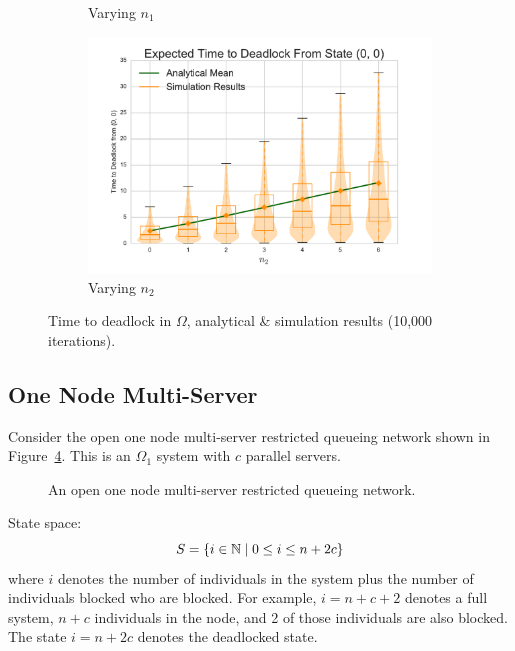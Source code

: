 \documentclass{article}
\numberwithin{equation}{section}
\begin{document}
\begin{figure}[!htbp]
\begin{center}
\begin{subfigure}[b]{0.35\textwidth}
  \caption{Varying $n_1$}
  \label{fig:timestodeadlockfb_n1}
\end{subfigure}
\begin{subfigure}[b]{0.35\textwidth}
  \includegraphics[width=\textwidth]{images/vary_n2fb}
  \caption{Varying $n_2$}
  \label{fig:timestodeadlockfb_n2}
\end{subfigure}
\end{center}
\caption{Time to deadlock in $\Omega$, analytical \& simulation results (10,000 iterations).}
\label{fig:timestodeadlockfeedback}
\end{figure}


\subsection{One Node Multi-Server}\label{sec:1nodeMS}

Consider the open one node multi-server restricted queueing network shown in Figure~\ref{fig:queueingnetwork_1nodemulti}.
This is an $\Omega_1$ system with $c$ parallel servers.

\begin{figure}[!htbp]
  \begin{center}
  
  \end{center}
  \caption{An open one node multi-server restricted queueing network.}
  \label{fig:queueingnetwork_1nodemulti}
\end{figure}

State space:
        \[S = \{i\in\mathbb{N} \nonscript\; | \nonscript\; 0 \leq i \leq n + 2c\}\]
where \(i\) denotes the number of individuals in the system plus the number of individuals blocked who are blocked.
For example, $i=n+c+2$ denotes a full system, $n+c$ individuals in the node, and 2 of those individuals are also blocked.
The state $i=n+2c$ denotes the deadlocked state.
\end{document}
